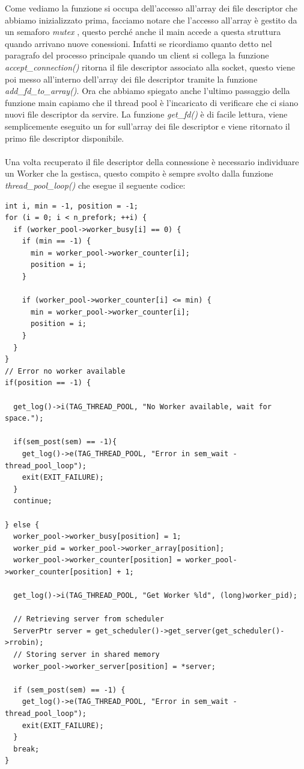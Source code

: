 \documentclass[italian]{tktltiki2}
\begin{document}
Come vediamo la funzione si occupa dell'accesso all'array dei file descriptor che abbiamo inizializzato prima, facciamo notare che l'accesso all'array è gestito da un semaforo \emph{mutex} , questo perché anche il main accede a questa struttura quando arrivano nuove conessioni. Infatti se ricordiamo quanto detto nel paragrafo del processo principale quando un client si collega la funzione \emph{accept\_connection()} ritorna il file descriptor associato alla socket, questo viene poi messo all'interno dell'array dei file descriptor tramite la funzione \emph{add\_fd\_to\_array()}. Ora che abbiamo spiegato anche l'ultimo passaggio della funzione main capiamo che il thread pool è l'incaricato di verificare che ci siano nuovi file descriptor da servire. La funzione \emph{get\_fd()} è di facile lettura, viene semplicemente eseguito un for sull'array dei file descriptor e viene ritornato il primo file descriptor disponibile.
\\
\\
Una volta recuperato il file descriptor della connessione è necessario individuare un Worker che la gestisca, questo compito è sempre svolto dalla funzione \emph{thread\_pool\_loop()} che esegue il seguente codice:
\begin{lstlisting}
int i, min = -1, position = -1;
for (i = 0; i < n_prefork; ++i) {
  if (worker_pool->worker_busy[i] == 0) {
    if (min == -1) {
      min = worker_pool->worker_counter[i];
      position = i;
    }

    if (worker_pool->worker_counter[i] <= min) {
      min = worker_pool->worker_counter[i];
      position = i;
    }
  }
}
// Error no worker available
if(position == -1) {
  
  get_log()->i(TAG_THREAD_POOL, "No Worker available, wait for space.");

  if(sem_post(sem) == -1){
    get_log()->e(TAG_THREAD_POOL, "Error in sem_wait - thread_pool_loop");
    exit(EXIT_FAILURE);
  }
  continue;

} else {
  worker_pool->worker_busy[position] = 1;
  worker_pid = worker_pool->worker_array[position];
  worker_pool->worker_counter[position] = worker_pool->worker_counter[position] + 1;
  
  get_log()->i(TAG_THREAD_POOL, "Get Worker %ld", (long)worker_pid);

  // Retrieving server from scheduler
  ServerPtr server = get_scheduler()->get_server(get_scheduler()->rrobin);
  // Storing server in shared memory
  worker_pool->worker_server[position] = *server;
  
  if (sem_post(sem) == -1) {
    get_log()->e(TAG_THREAD_POOL, "Error in sem_wait - thread_pool_loop");
    exit(EXIT_FAILURE);
  }
  break;
}
\end{lstlisting}
\end{document}
